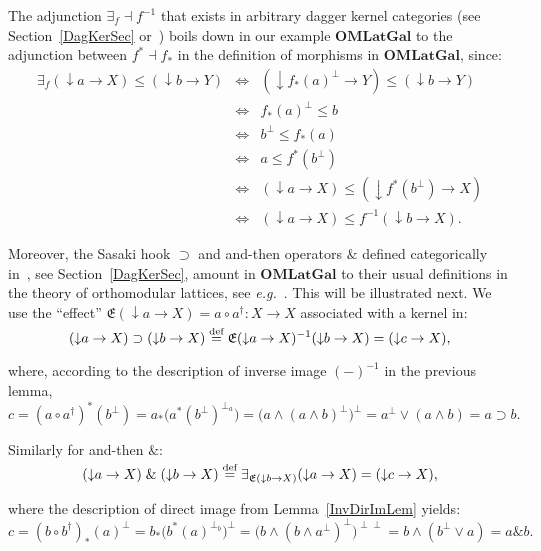 \documentclass{article}
\newcommand{\after}{\mathrel{\circ}}
\newcommand{\Cat}[1]{\ensuremath{\mathbf{#1}}}
\newcommand{\sasaki}{\mathrel{\supset}}
\newcommand{\andthen}{\mathrel{\&}}
\newcommand{\conjun}{\mathrel{\wedge}}
\newcommand{\disjun}{\mathrel{\vee}}
\newcommand{\downset}{\mathop{\downarrow}\!}
\newcommand{\effect}[1]{\mathfrak{E}(#1)}
\begin{document}
The adjunction $\exists_{f} \dashv f^{-1}$ that exists in arbitrary
dagger kernel categories (see Section~\ref{DagKerSec}
or~\cite[Proposition~4.3]{HeunenJ09a}) boils down in our example
\Cat{OMLatGal} to the adjunction between $f^{*} \dashv f_{*}$ in the
definition of morphisms in \Cat{OMLatGal}, since:
$$\begin{array}{rcl}
\exists_{f}(\downset a\rightarrow X) \leq (\downset b\rightarrow Y)
& \Longleftrightarrow &
(\downset f_{*}(a)^{\perp} \rightarrow Y) \leq (\downset b\rightarrow Y) \\
& \Longleftrightarrow &
f_{*}(a)^{\perp} \leq b \\
& \Longleftrightarrow &
b^{\perp} \leq f_{*}(a) \\
& \Longleftrightarrow &
a \leq f^{*}(b^{\perp}) \\
& \Longleftrightarrow &
(\downset a \rightarrow X) \leq (\downset f^{*}(b^{\perp}) \rightarrow X) \\
& \Longleftrightarrow &
(\downset a \rightarrow X) \leq f^{-1}(\downset b \rightarrow X).
\end{array}$$

\noindent Moreover, the Sasaki hook $\sasaki$ and and-then operators
$\andthen$ defined categorically
in~\cite[Proposition~6.1]{HeunenJ09a}, see Section~\ref{DagKerSec},
amount in \Cat{OMLatGal} to their usual definitions in the theory of
orthomodular lattices, see \textit{e.g.}~\cite{Finch70,Kalmbach83}. This will
be illustrated next.  We use the ``effect'' $\effect{\downset
a\rightarrow X} = a \after a^{\dag} \colon X\rightarrow X$ associated
with a kernel in:
$$(\downset a\rightarrow X) \sasaki (\downset b\rightarrow X)
\;\smash{\stackrel{\textrm{def}}{=}}\;
\effect{\downset a\rightarrow X}^{-1}(\downset b\rightarrow X)
=
(\downset c\rightarrow X),$$

\noindent where, according to the description of inverse image 
$(-)^{-1}$ in the previous lemma,
$$c 
=
(a \after a^{\dag})^{*}(b^{\perp})
=
a_{*}\big(a^{*}(b^{\perp})^{\perp_a}\big)
=
\big(a \conjun (a \conjun b)^{\perp}\big)^{\perp}
=
a^{\perp} \disjun (a\conjun b)
=
a \sasaki b.$$

\noindent Similarly for and-then $\andthen$:
$$(\downset a\rightarrow X) \andthen (\downset b\rightarrow X)
\;\smash{\stackrel{\textrm{def}}{=}}\;
\exists_{\effect{\downset b\rightarrow X}}(\downset a\rightarrow X) 
=
(\downset c\rightarrow X),$$

\noindent where the description of direct image from
Lemma~\ref{InvDirImLem} yields:
$$c
=
(b \after b^{\dag})_{*}(a)^{\perp}
=
b_{*}\big(b^{*}(a)^{\perp_b}\big)^{\perp}
=
\big(b \conjun (b \conjun a^{\perp})^{\perp}\big)^{\perp\perp}
=
b \conjun (b^{\perp} \disjun a)
=
a \andthen b.$$
\end{document}
